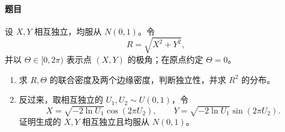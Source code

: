 \paragraph{题目}
设 $X,Y$ 相互独立，均服从 $N(0,1)$。令
\[
R=\sqrt{X^2+Y^2},
\]
并以 $\Theta\in[0,2\pi)$ 表示点 $(X,Y)$ 的极角；在原点约定 $\Theta=0$。
\begin{enumerate}
\item 求 $R,\Theta$ 的联合密度及两个边缘密度，判断独立性，并求 $R^2$ 的分布。

\item 反过来，取相互独立的 $U_1,U_2\sim U(0,1)$，令
\[X=\sqrt{-2\ln U_1}\cos(2\pi U_2),\qquad Y=\sqrt{-2\ln U_1}\sin(2\pi U_2).\]
证明生成的 $X,Y$ 相互独立且均服从 $N(0,1)$。
\end{enumerate}

